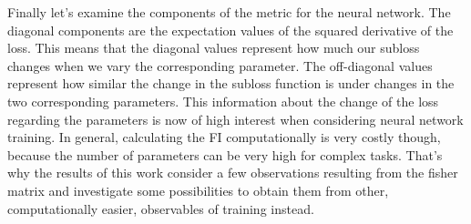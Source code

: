 Finally let's examine the components of the metric for the neural network. The diagonal components are the expectation values of the squared derivative of the loss. This means that the diagonal values represent how much our subloss changes when we vary the corresponding parameter. The off-diagonal values represent how similar the change in the subloss function is under changes in the two corresponding parameters. This information about the change of the loss regarding the parameters is now of high interest when considering neural network training. In general, calculating the FI computationally is very costly though, because the number of parameters can be very high for complex tasks. That's why the results of this work consider a few observations resulting from the fisher matrix and investigate some possibilities to obtain them from other, computationally easier, observables of training instead.